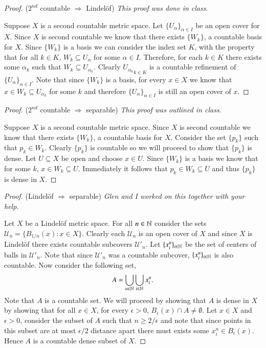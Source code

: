 \documentclass[minion]{homework651}
\begin{document}
\begin{problems}
\begin{proof} ($2^{nd}$ countable $\Rightarrow$ Lindelöf) \emph{This proof was done in class}. 
    
    Suppose $X$ is a second countable metric space. Let $\{U_{\alpha}\}_{\alpha \in I}$ be an open cover for $X$. Since $X$ is 
    second countable we know that there exists $\{W_k\}$, a countable basis for $X$. Since $\{W_k\}$ is a basis we can consider the index set $K$, with the property that for all $k \in K$, $W_k \subseteq U_{\alpha}$ for some $\alpha \in I$. Therefore, for each $k \in K$ there exists some $\alpha_k$ such that $W_k \subseteq U_{\alpha_k}$. Clearly ${U_{\alpha_k}}_{k \in K}$ is a countable refinement of $\{U_{\alpha}\}_{\alpha \in I}$.
    Note that since $\{W_k\}$ is a basis, for every $x \in X$ we know that $x \in W_k \subseteq U_{\alpha_k}$ for some $k$ and therefore $\{U_{\alpha}\}_{\alpha \in I}$ is still an open cover of $x$.
\end{proof}


\begin{proof} ($2^{nd}$ countable $\Rightarrow$ separable) \emph{This proof was outlined in class}. 
    
    Suppose $X$ is a second countable metric space. Since $X$ is second countable we know that there exists $\{W_k\}$, a countable basis for $X$. Consider the set $\{p_k\}$ such that $p_k \in W_k$. Clearly $\{p_k\}$ is countable so we will proceed to show that $\{p_k\}$ is dense. Let $U \subseteq X$ be open and choose $x \in U$. Since $\{W_k\}$ is a basis we know that for some $k$, $x \in W_k \subseteq U$. Immediately it follows that $p_k \in W_k \subseteq U$ and thus $\{p_k\}$ is dense in $X$. 
\end{proof}


\begin{proof} (Lindelöf $\Rightarrow$ separable) \emph{Glen and I worked on this together with your help.} 
    
    Let $X$ be a Lindelöf metric space.
    For all $n \in \mathbb N$ consider the sets $\mathcal{U}_n = \{B_{1/n}(x): x \in X\}$. Clearly each $\mathcal{U}_n$ is an open cover of $X$ and since $X$ is Lindelöf there exists countable subcovers $\mathcal{{U'}}_n$. Let $\{x^n_i\}_{i \in \mathbb N}$ be the set of centers of balls in $\mathcal{{U'}}_n$. Note that since $\mathcal{{U'}}_n$ was a countable subcover, 
    $\{x^n_i\}_{i \in \mathbb N}$ is also countable. Now consider the following set, 
    \begin{equation*}
        A = \bigcup_{n \in \mathbb N}\bigcup_{i \in \mathbb N} x^n_i.
    \end{equation*}
    Note that $A$ is a countable set. We will proceed by showing that $A$ is dense in $X$ by showing that for all $x \in X$, for every $\epsilon>0$, $B_\epsilon(x)\cap A \neq \emptyset$. Let $x \in X$ and $\epsilon > 0$, consider the subset of $A$ such that $n \geq 2/\epsilon$ and note that since points in this subset are at most $\epsilon/2$ distance apart there must exists some $x^n_i \in B_\epsilon(x)$. Hence $A$ is a countable dense subset of $X$.
\end{proof}



\end{problems}
\end{document}
